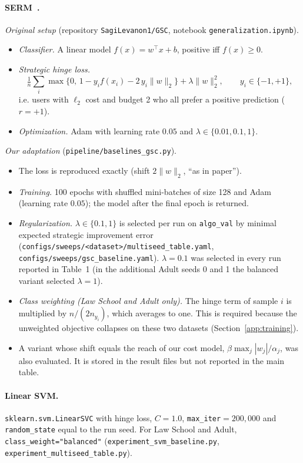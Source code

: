 \paragraph{\textsc{SERM}~\cite{levanon2022generalized}.}
\emph{Original setup} (repository \texttt{SagiLevanon1/GSC}, notebook
\texttt{generalization.ipynb}).
\begin{itemize}
  \item \emph{Classifier.} A linear model $f(x)=w^\top x+b$, positive iff
        $f(x)\ge 0$.
  \item \emph{Strategic hinge loss.}
        \[
          \tfrac{1}{n}\sum_i\max\{0,\,1-y_if(x_i)-2\,y_i\|w\|_2\}+\lambda\|w\|_2^2,
          \qquad y_i\in\{-1,+1\},
        \]
        i.e. users with $\ell_2$ cost and budget 2 who all prefer a positive
        prediction ($r=+1$).
  \item \emph{Optimization.} Adam with learning rate $0.05$ and
        $\lambda\in\{0.01,0.1,1\}$.
\end{itemize}
\emph{Our adaptation} (\texttt{pipeline/baselines\_gsc.py}).
\begin{itemize}
  \item The loss is reproduced exactly (shift $2\|w\|_2$, ``as in paper'').
  \item \emph{Training.} 100 epochs with shuffled mini-batches of size 128 and
        Adam (learning rate $0.05$); the model after the final epoch is returned.
  \item \emph{Regularization.} $\lambda\in\{0.1,1\}$ is selected per run on
        \texttt{algo\_val} by minimal expected strategic improvement error
        (\texttt{configs/sweeps/<dataset>/multiseed\_table.yaml},
        \texttt{configs/sweeps/gsc\_baseline.yaml}). $\lambda=0.1$ was selected
        in every run reported in Table~1 (in the additional Adult seeds 0 and
        1 the balanced variant selected $\lambda=1$).
  \item \emph{Class weighting (Law School and Adult only).} The hinge term of
        sample $i$ is multiplied by $n/(2n_{y_i})$, which averages to one. This
        is required because the unweighted objective collapses on these two
        datasets (Section~\ref{app:training}).
  \item A variant whose shift equals the reach of our cost model,
        $\beta\max_j|w_j|/\alpha_j$, was also evaluated. It is stored in the
        result files but not reported in the main table.
\end{itemize}

\paragraph{Linear SVM.}
\texttt{sklearn.svm.LinearSVC} with hinge loss, $C=1.0$,
\texttt{max\_iter}$=200{,}000$ and \texttt{random\_state} equal to the run seed.
For Law School and Adult, \texttt{class\_weight="balanced"}
(\texttt{experiment\_svm\_baseline.py}, \texttt{experiment\_multiseed\_table.py}).

